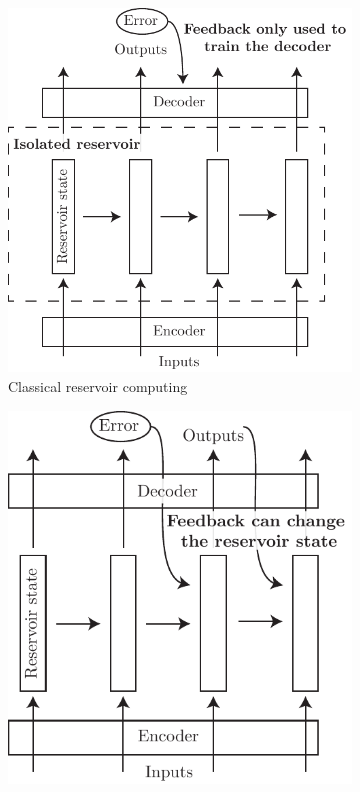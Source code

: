 \begin{figure}[htbp]
  \centering
  \begin{subfigure}[t]{.5\linewidth}
    \centering
    \includegraphics[width=\linewidth]{figures/classical_reservoir.pdf}
    \caption{Classical reservoir computing}
    \label{fig:classical_reservoir}
  \end{subfigure}
  \begin{subfigure}[t]{.45\linewidth}
    \centering
    \includegraphics[width=\linewidth]{figures/feedback_reservoir.pdf}

\end{subfigure}
\end{figure}

